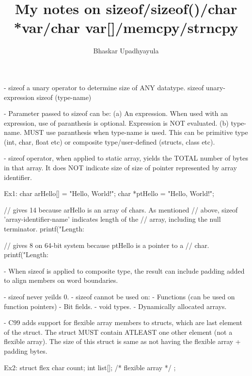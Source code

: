 \documentclass{article}
\title{My notes on sizeof/sizeof()/char *var/char var[]/memcpy/strncpy}
\author{Bhaskar Upadhyayula}
\begin{document}

\maketitle

\newpage  


- sizeof a unary operator to determine size of ANY datatype. 
        sizeof unary-expression
        sizeof (type-name)

- Parameter passed to sizeof can be: 
  (a) An expression. When used with an expression, use of paranthesis is
  optional. Expression is NOT evaluated.  
  (b) type-name. MUST use paranthesis when type-name is used. This can be
  primitive type (int, char, float etc) or composite type/user-defined
  (structs, class etc). 

- sizeof operator, when applied to static array, yields the TOTAL number
  of bytes in that array. It does NOT indicate size of size of pointer
  represented by array identifier. 

  Ex1: 
        char arHello[] = "Hello, World!"; 
        char *ptHello  = "Hello, World!"; 

        // gives 14 because arHello is an array of chars. As mentioned
        // above, sizeof 'array-identifier-name' indicates length of the
        // array, including the null terminator.  
        printf("Length: %

        // gives 8 on 64-bit system because ptHello is a pointer to a
        // char. 
        printf("Length: %

- When sizeof is applied to composite type, the result can include padding
  added to align members on word boundaries.

- sizeof never yeilds 0. 
- sizeof cannot be used on: 
        - Functions (can be used on function pointers)
        - Bit fields. 
        - void types. 
        - Dynamically allocated arrays. 

- C99 adds support for flexible array members to structs, which are last
  element of the struct. The struct MUST contain ATLEAST one other element
  (not a flexible array). The size of this struct is same as not having
  the flexible array + padding bytes. 

  Ex2: 
        struct flex 
        {
                char count; 
                int list[]; /* flexible array */
        }; 
\end{document}

